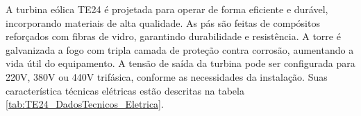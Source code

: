     \begin{table}[h]
        \caption{Comparação entre geração estimada com dados teóricos e dados reais de geração de energia eólica na Vila Santa Terezinha, Franca – SP.}
        \centering
        \label{tab:GeraçãoDiferentesVel_TE24}
    \end{table}    


    \par A turbina eólica TE24 é projetada para operar de forma eficiente e durável, incorporando materiais de alta qualidade. As pás são feitas de compósitos reforçados com fibras de vidro, garantindo durabilidade e resistência. A torre é galvanizada a fogo com tripla camada de proteção contra corrosão, aumentando a vida útil do equipamento. A tensão de saída da turbina pode ser configurada para 220V, 380V ou 440V trifásica, conforme as necessidades da instalação. Suas característica técnicas elétricas estão descritas na tabela \ref{tab:TE24_DadosTecnicos_Eletrica}.

